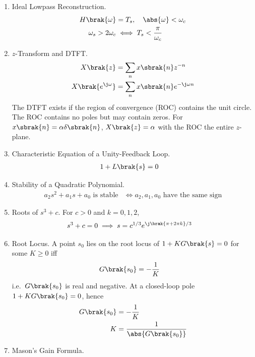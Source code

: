 \begin{enumerate}[label=\thesubsection.\arabic*, ref=\thesubsection.\theenumi]
\begin{align}
\\
Y\brak{\omega} &= \frac{1}{T_s} \sum_{k} e^{-\j k \omega_s \tau} F\brak{\omega - k \omega_s}
\end{align}
\item Ideal Lowpass Reconstruction.
\begin{align}
H\brak{\omega} &= T_s, \quad \abs{\omega} < \omega_c
\label{eq:F-lpf}
\\
\omega_s > 2\omega_c &\iff T_s < \frac{\pi}{\omega_c}
\label{eq:F-nyquist}
\end{align}
\item $z$-Transform and DTFT.
\begin{align}
X\brak{z} &= \sum_{n} x\sbrak{n} z^{-n}
\\
X\brak{e^{\j \omega}} &= \sum_{n} x\sbrak{n} e^{-\j \omega n}
\label{eq:F-ztrans}
\end{align}
The DTFT exists if the region of convergence (ROC) contains the unit circle. The ROC contains no poles but may contain zeros. For $x\sbrak{n} = \alpha \delta\sbrak{n}$, $X\brak{z} = \alpha$ with the ROC the entire $z$-plane.
\item Characteristic Equation of a Unity-Feedback Loop.
\begin{align}
1 + L\brak{s} &= 0
\label{eq:F-char}
\end{align}
\item Stability of a Quadratic Polynomial.
\begin{align}
a_2 s^2 + a_1 s + a_0 \text{ is stable} &\iff a_2, a_1, a_0 \text{ have the same sign}
\label{eq:F-hurwitz2}
\end{align}
\item Roots of $s^3 + c$. For $c > 0$ and $k = 0, 1, 2$,
\begin{align}
s^3 + c = 0 &\implies s = c^{1/3} e^{\j \brak{\pi + 2\pi k}/3}
\label{eq:F-cubic-roots}
\end{align}
\item Root Locus. A point $s_0$ lies on the root locus of $1 + K G\brak{s} = 0$ for some $K \ge 0$ iff
\begin{align}
G\brak{s_0} &= -\frac{1}{K}
\label{eq:F-rootlocus}
\end{align}
i.e.\ $G\brak{s_0}$ is real and negative.
\solution At a closed-loop pole $1 + K G\brak{s_0} = 0$, hence
\begin{align}
G\brak{s_0} &= -\frac{1}{K}
\\
K &= \frac{1}{\abs{G\brak{s_0}}}
\end{align}
\item Mason's Gain Formula.

\end{enumerate}
